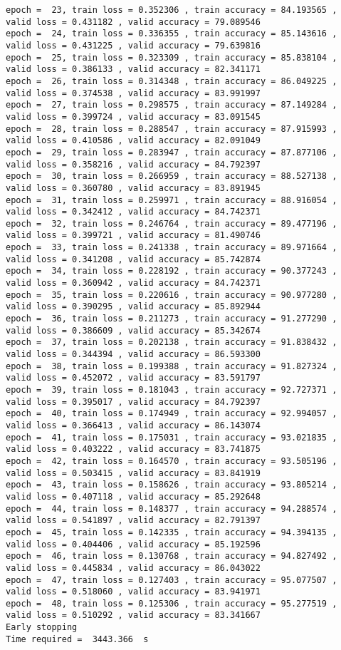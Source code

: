\documentclass[11pt]{article}
\begin{document}
\begin{Verbatim}[commandchars=\\\{\}]
epoch =  23, train loss = 0.352306 , train accuracy = 84.193565 , valid loss = 0.431182 , valid accuracy = 79.089546
epoch =  24, train loss = 0.336355 , train accuracy = 85.143616 , valid loss = 0.431225 , valid accuracy = 79.639816
epoch =  25, train loss = 0.323309 , train accuracy = 85.838104 , valid loss = 0.386133 , valid accuracy = 82.341171
epoch =  26, train loss = 0.314348 , train accuracy = 86.049225 , valid loss = 0.374538 , valid accuracy = 83.991997
epoch =  27, train loss = 0.298575 , train accuracy = 87.149284 , valid loss = 0.399724 , valid accuracy = 83.091545
epoch =  28, train loss = 0.288547 , train accuracy = 87.915993 , valid loss = 0.410586 , valid accuracy = 82.091049
epoch =  29, train loss = 0.283947 , train accuracy = 87.877106 , valid loss = 0.358216 , valid accuracy = 84.792397
epoch =  30, train loss = 0.266959 , train accuracy = 88.527138 , valid loss = 0.360780 , valid accuracy = 83.891945
epoch =  31, train loss = 0.259971 , train accuracy = 88.916054 , valid loss = 0.342412 , valid accuracy = 84.742371
epoch =  32, train loss = 0.246764 , train accuracy = 89.477196 , valid loss = 0.399721 , valid accuracy = 81.490746
epoch =  33, train loss = 0.241338 , train accuracy = 89.971664 , valid loss = 0.341208 , valid accuracy = 85.742874
epoch =  34, train loss = 0.228192 , train accuracy = 90.377243 , valid loss = 0.360942 , valid accuracy = 84.742371
epoch =  35, train loss = 0.220616 , train accuracy = 90.977280 , valid loss = 0.390295 , valid accuracy = 85.892944
epoch =  36, train loss = 0.211273 , train accuracy = 91.277290 , valid loss = 0.386609 , valid accuracy = 85.342674
epoch =  37, train loss = 0.202138 , train accuracy = 91.838432 , valid loss = 0.344394 , valid accuracy = 86.593300
epoch =  38, train loss = 0.199388 , train accuracy = 91.827324 , valid loss = 0.452072 , valid accuracy = 83.591797
epoch =  39, train loss = 0.181043 , train accuracy = 92.727371 , valid loss = 0.395017 , valid accuracy = 84.792397
epoch =  40, train loss = 0.174949 , train accuracy = 92.994057 , valid loss = 0.366413 , valid accuracy = 86.143074
epoch =  41, train loss = 0.175031 , train accuracy = 93.021835 , valid loss = 0.403222 , valid accuracy = 83.741875
epoch =  42, train loss = 0.164570 , train accuracy = 93.505196 , valid loss = 0.503415 , valid accuracy = 83.841919
epoch =  43, train loss = 0.158626 , train accuracy = 93.805214 , valid loss = 0.407118 , valid accuracy = 85.292648
epoch =  44, train loss = 0.148377 , train accuracy = 94.288574 , valid loss = 0.541897 , valid accuracy = 82.791397
epoch =  45, train loss = 0.142335 , train accuracy = 94.394135 , valid loss = 0.404406 , valid accuracy = 85.192596
epoch =  46, train loss = 0.130768 , train accuracy = 94.827492 , valid loss = 0.445834 , valid accuracy = 86.043022
epoch =  47, train loss = 0.127403 , train accuracy = 95.077507 , valid loss = 0.518060 , valid accuracy = 83.941971
epoch =  48, train loss = 0.125306 , train accuracy = 95.277519 , valid loss = 0.510292 , valid accuracy = 83.341667
Early stopping
Time required =  3443.366  s 

    \end{Verbatim}
\end{document}
